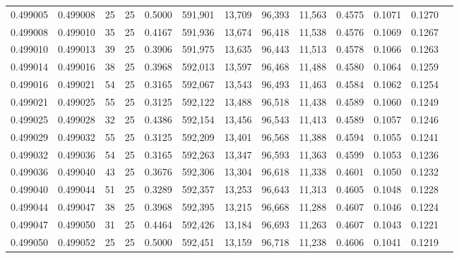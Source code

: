 \begin{tabular}{rrrrrrrrrrrrr}
0.499005 & 0.499008 &    25 &  25 &                                     0.5000 & 591,901 &  13,709 &  96,393 &  11,563 & 0.4575 & 0.1071 & 0.1270 \\
0.499008 & 0.499010 &    35 &  25 &                                     0.4167 & 591,936 &  13,674 &  96,418 &  11,538 & 0.4576 & 0.1069 & 0.1267 \\
0.499010 & 0.499013 &    39 &  25 &                                     0.3906 & 591,975 &  13,635 &  96,443 &  11,513 & 0.4578 & 0.1066 & 0.1263 \\
0.499014 & 0.499016 &    38 &  25 &                                     0.3968 & 592,013 &  13,597 &  96,468 &  11,488 & 0.4580 & 0.1064 & 0.1259 \\
0.499016 & 0.499021 &    54 &  25 &                                     0.3165 & 592,067 &  13,543 &  96,493 &  11,463 & 0.4584 & 0.1062 & 0.1254 \\
0.499021 & 0.499025 &    55 &  25 &                                     0.3125 & 592,122 &  13,488 &  96,518 &  11,438 & 0.4589 & 0.1060 & 0.1249 \\
0.499025 & 0.499028 &    32 &  25 &                                     0.4386 & 592,154 &  13,456 &  96,543 &  11,413 & 0.4589 & 0.1057 & 0.1246 \\
0.499029 & 0.499032 &    55 &  25 &                                     0.3125 & 592,209 &  13,401 &  96,568 &  11,388 & 0.4594 & 0.1055 & 0.1241 \\
0.499032 & 0.499036 &    54 &  25 &                                     0.3165 & 592,263 &  13,347 &  96,593 &  11,363 & 0.4599 & 0.1053 & 0.1236 \\
0.499036 & 0.499040 &    43 &  25 &                                     0.3676 & 592,306 &  13,304 &  96,618 &  11,338 & 0.4601 & 0.1050 & 0.1232 \\
0.499040 & 0.499044 &    51 &  25 &                                     0.3289 & 592,357 &  13,253 &  96,643 &  11,313 & 0.4605 & 0.1048 & 0.1228 \\
0.499044 & 0.499047 &    38 &  25 &                                     0.3968 & 592,395 &  13,215 &  96,668 &  11,288 & 0.4607 & 0.1046 & 0.1224 \\
0.499047 & 0.499050 &    31 &  25 &                                     0.4464 & 592,426 &  13,184 &  96,693 &  11,263 & 0.4607 & 0.1043 & 0.1221 \\
0.499050 & 0.499052 &    25 &  25 &                                     0.5000 & 592,451 &  13,159 &  96,718 &  11,238 & 0.4606 & 0.1041 & 0.1219 \\

\end{tabular}
